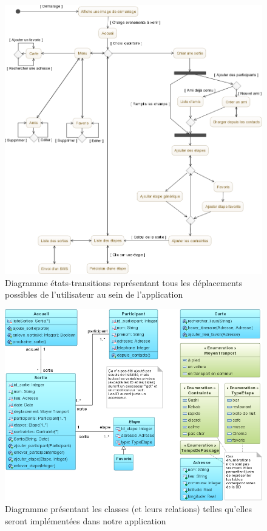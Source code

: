 \documentclass[a4paper, 12pt, notitlepage]{article} %
\begin{document}
\vfill
\begin{figure}[!htb]
    \centering
    \includegraphics[width=1\textwidth]{Diagramme_d_etat.png}
    \caption[Diagramme états-transitions]{Diagramme états-transitions représentant tous les déplacements possibles de l'utilisateur au sein de l'application}
    \label{fig:EtatTrans}
\end{figure}
\vfill

\begin{figure}[!htb]
    \centering
    \includegraphics[width=1\textwidth]{Diagramme_de_classe_principal.png}
    \caption[Diagramme des classes principales]{Diagramme présentant les classes (et leurs relations) telles qu'elles seront implémentées dans notre application}
    \label{fig:Classes}
\end{figure}
\clearpage
\end{document}
